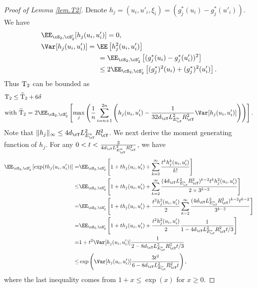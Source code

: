 \documentclass[11pt]{article} %
\begin{document}
\begin{proof}[Proof of Lemma \ref{lem.T2}]
	Denote $h_j=(u_i,u'_i,\xi_i)=(g_j^*(u_i)-g_j^*(u'_i))$. We have
	\begin{align*}
		&\EE_{\cS_2,\cS'_2} [h_j(u_i,u'_i)]=0,\\
		&\Var [h_j(u_i,u'_i)]=\EE \left[ h_j^2(u_i,u'_i)\right]\\
		&\hspace{2.88cm}=\EE_{\cS_2,\cS'_2} \left[(g_j^*(u_i)-g_j^*(u'_i))^2\right]\\
		&\hspace{2.88cm}\leq  2\EE_{\cS_2,\cS'_2} \left[ (g_j^*)^2(u_i)+(g_j^*)^2(u'_i) \right].
	\end{align*}
	Thus ${\rm T_2}$ can be bounded as
	\begin{align*}
		&{\rm T_2}\leq {\rm \widetilde{T}_2}+6\delta\\
		&\mbox{with } {\rm \widetilde{T}_2}=2\EE_{\cS_2,\cS'_2}\left[\max_j\left(\frac{1}{n}\sum_{i=n+1}^{2n} \left( h_j(u_i,u'_i)-\frac{1}{32d_{\cY}L_{E^n_{\cY}}^2R_{\cY}^2}\Var [h_j(u_i,u'_i)]\right)\right)\right].
	\end{align*}
	Note that $\|h_j\|_{\infty}\leq 4d_{\cY}L_{E^n_{\cY}}^2R_{\cY}^2$. We next derive the moment generating function of $h_j$. For any $0<t<\frac{3}{4d_{\cY}L_{E^n_{\cY}}^2R_{\cY}^2}$, we have
	\begin{align}
		\EE_{\cS_2,\cS'_2}\left[\exp(th_j(u_i,u'_i))\right]=& \EE_{\cS_2,\cS'_2}\left[ 1+th_j(u_i,u'_i)+\sum_{k=2}^{\infty} \frac{t^kh_j^k(u_i,u'_i)}{k!}\right] \nonumber\\
		\leq & \EE_{\cS_2,\cS'_2}\left[ 1+th_j(u_i,u'_i)+\sum_{k=2}^{\infty} \frac{(4d_{\cY}L_{E^n_{\cY}}^2R_{\cY}^2)^{k-2}t^kh_j^2(u_i,u'_i)}{2\times 3^{k-2}}\right] \nonumber\\
		=& \EE_{\cS_2,\cS'_2}\left[ 1+th_j(u_i,u'_i)+\frac{t^2h_j^2(u_i,u'_i)}{2}\sum_{k=2}^{\infty} \frac{(4d_{\cY}L_{E^n_{\cY}}^2R_{\cY}^2)^{k-2}t^{k-2}}{3^{k-2}}\right] \nonumber\\
		=& \EE_{\cS_2,\cS'_2}\left[ 1+th_j(u_i,u'_i)+\frac{t^2h_j^2(u_i,u'_i)}{2}\frac{1}{1-4d_{\cY}L_{E^n_{\cY}}^2R_{\cY}^2t/3}\right] \nonumber\\
		=& 1+t^2\Var[h_j(u_i,u'_i)]\frac{1}{2-8d_{\cY}L_{E^n_{\cY}}^2R_{\cY}^2t/3} \nonumber\\
		\leq& \exp\left( \Var[h_j(u_i,u'_i)]\frac{3t^2}{6-8d_{\cY}L_{E^n_{\cY}}^2R_{\cY}^2t} \right),
		\label{eq.h.var}
	\end{align}
	where the last inequality comes from $1+x\leq \exp(x)$ for $x\geq 0$.
	

\end{proof}
\end{document}
